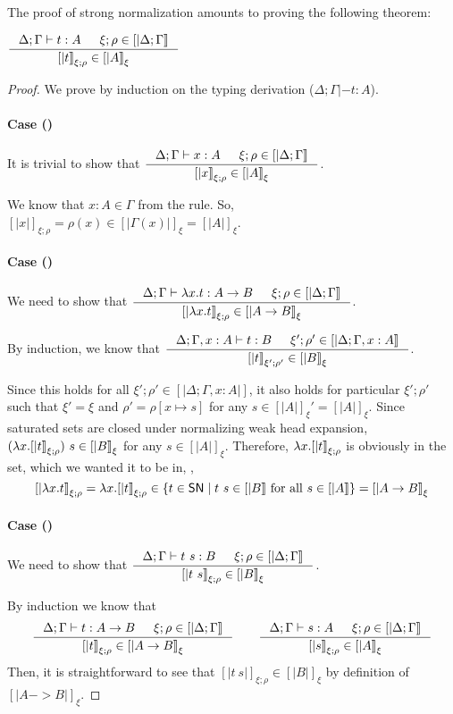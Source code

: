 The proof of strong normalization amounts to proving the following theorem:
\begin{theorem}
$ \inference{\Delta;\Gamma|- t:A & \xi;\rho \in [|\Delta;\Gamma|]}
            {[|t|]_{\xi;\rho} \in [|A|]_\xi} $
\end{theorem}
\begin{proof}
We prove by induction on the typing derivation ($\Delta;\Gamma|- t:A$).
\paragraph{Case ()}
It is trivial to show that
$ \inference{\Delta;\Gamma |- x:A & \xi;\rho \in [|\Delta;\Gamma|]}
        {[|x|]_{\xi;\rho} \in [|A|]_\xi} $.

We know that $x:A \in \Gamma$ from the  rule.
So, $[|x|]_{\xi;\rho} =\rho(x)\in[|\Gamma(x)|]_\xi = [|A|]_\xi$.

\paragraph{Case ()}
We need to show that
$ \inference{\Delta;\Gamma |- \l x.t : A -> B & \xi;\rho \in [|\Delta;\Gamma|]}
        {[|\l x.t|]_{\xi;\rho} \in [|A -> B|]_\xi} $.

By induction, we know that
$ \inference{\Delta;\Gamma,x:A |- t : B & \xi';\rho' \in [|\Delta;\Gamma,x:A|]}
             {[|t|]_{\xi';\rho'} \in [|B|]_\xi} $.

Since this holds for all $\xi';\rho' \in [|\Delta;\Gamma,x:A|]$, it also holds
for particular $\xi';\rho'$ such that $\xi'=\xi$ and
$\rho' = \rho[x \mapsto s]$ for any $s \in [|A|]_\xi' = [|A|]_\xi$.
Since saturated sets are closed under normalizing weak head expansion,
$(\lambda x.[|t|]_{\xi;\rho})~s \in[|B|]_\xi$ for any $s\in[|A|]_\xi$.
Therefore, $\lambda x.[|t|]_{\xi;\rho}$ is obviously in the set,
which we wanted it to be in, \ie,
\[ [|\lambda x.t|]_{\xi;\rho} = \lambda x.[|t|]_{\xi;\rho}
   \in \{t\in \mathsf{SN} \mid t~s\in[|B|] ~\text{for all}~ s\in[|A|]\} 
 = [|A -> B|]_\xi \]

\paragraph{Case ()}
We need to show that
$ \inference{\Delta;\Gamma |- t~s : B & \xi;\rho\in[|\Delta;\Gamma|]}{[|t~s|]_{\xi;\rho} \in [|B|]_\xi} $.

By induction we know that
\[
\inference{\Delta;\Gamma |- t : A -> B & \xi;\rho\in[|\Delta;\Gamma|]}{[|t|]_{\xi;\rho} \in [|A -> B|]_\xi}
\qquad
\inference{\Delta;\Gamma |- s : A & \xi;\rho\in[|\Delta;\Gamma|]}{[|s|]_{\xi;\rho} \in [|A|]_\xi}
\]
Then, it is straightforward to see that $[|t~s|]_{\xi;\rho}\in[|B|]_\xi$
by definition of $[|A -> B|]_\xi$.


\end{proof}
